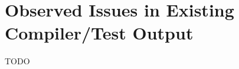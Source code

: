 \section{Observed Issues in Existing Compiler/Test Output} %


\begin{justify}
    TODO
\end{justify}






